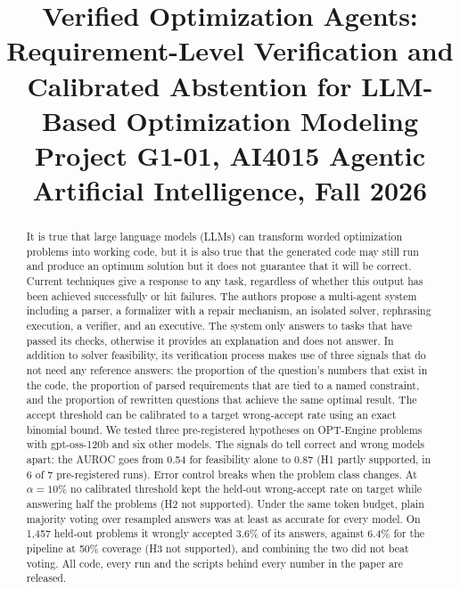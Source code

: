 \documentclass[conference]{IEEEtran}
\begin{document}
\title{Verified Optimization Agents: Requirement-Level Verification and Calibrated Abstention for LLM-Based
Optimization Modeling\\[2pt]
\large Project G1-01, AI4015 Agentic Artificial Intelligence, Fall 2026}

\author{
\and
{}
\and
{}
}

\maketitle

\begin{abstract}
It is true that large language models (LLMs) can transform worded optimization problems into working code, but it is also true that the
generated code may still run and produce an optimum solution but it does not guarantee that it will be correct.
Current techniques give a response to any task, regardless of whether this output has been achieved successfully or
hit failures. The authors propose a multi-agent system including a parser, a formalizer with a repair mechanism, an
isolated solver, rephrasing execution, a verifier, and an executive. The system only answers to tasks that have passed
its checks, otherwise it provides an explanation and does not answer. In addition to solver feasibility, its
verification process makes use of three signals that do not need any reference answers: the proportion of the question's
numbers that exist in the code, the proportion of parsed requirements that are tied to a named constraint, and
the proportion of rewritten questions that achieve the same optimal result. The accept threshold can be calibrated to a
target wrong-accept rate using an exact binomial bound. We tested three
pre-registered hypotheses on OPT-Engine problems with gpt-oss-120b and six other models. The signals do tell correct
and wrong models apart: the AUROC goes from 0.54 for feasibility alone to 0.87 (H1 partly supported, in 6 of 7
pre-registered runs). Error control breaks when the problem class changes. At $\alpha = 10\%$ no calibrated
threshold kept the held-out wrong-accept rate on target while answering half the problems (H2 not supported).
Under the same token budget, plain majority voting over resampled answers was at least as accurate for every model.
On 1,457 held-out problems it wrongly accepted 3.6\% of its answers, against 6.4\% for the pipeline at 50\% coverage
(H3 not supported), and combining the two did not beat voting. All code, every run and the scripts behind every number in the paper are released.
\end{abstract}
\end{document}
